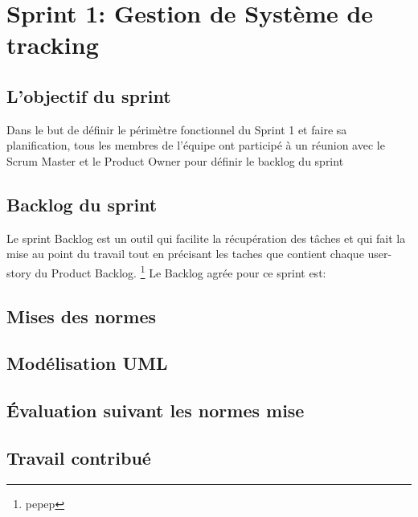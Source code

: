 \section{Sprint 1: Gestion de Système de tracking}

\subsection{L'objectif du sprint}
Dans le but de définir le périmètre fonctionnel du Sprint 1 et faire
sa planification, tous les membres de l'équipe ont participé à un réunion
avec le Scrum Master et le Product Owner pour définir le backlog du sprint 
\subsection{Backlog du sprint}
Le sprint Backlog est un outil qui facilite la récupération des tâches et qui fait
la mise au point du travail tout en précisant les taches que contient chaque 
user-story du Product Backlog.
\footnote{pepep}
Le Backlog agrée pour ce sprint est:
\subsection{Mises des normes}
\subsection{Modélisation UML}
\subsection{Évaluation suivant les normes mise}
\subsection{Travail contribué}



